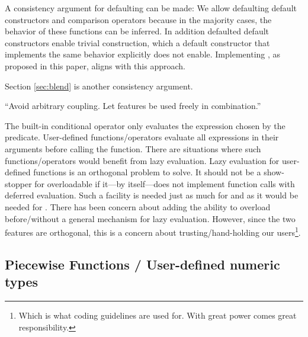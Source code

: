 \begin{description}
    A consistency argument for defaulting  can be made:
    We allow defaulting default constructors and comparison operators because in the majority cases, the behavior of these functions can be inferred.
    In addition defaulted default constructors enable trivial construction, which a default constructor that implements the same behavior explicitly does not enable.
    Implementing , as proposed in this paper, aligns with this approach.

    Section \ref{sec:blend} is another consistency argument.

  \item[Be orthogonal] “Avoid arbitrary coupling.
    Let features be used freely in combination.”

    The built-in conditional operator only evaluates the expression chosen by the predicate.
    User-defined functions/operators evaluate all expressions in their arguments before calling the function.
    There are situations where such functions/operators would benefit from lazy evaluation.
    Lazy evaluation for user-defined functions is an orthogonal problem to solve.
    It should not be a show-stopper for overloadable  if it---by itself---does not implement function calls with deferred evaluation.
    Such a facility is needed just as much for  and  as it would be needed for .
    There has been concern about adding the ability to overload  before/without a general mechanism for lazy evaluation.
    However, since the two features are orthogonal, this is a concern about trusting/hand-holding our users\footnote{Which is what coding guidelines are used for. With great power comes great responsibility.}.
\end{description}

\subsection{Piecewise Functions / User-defined numeric types}\label{sec:piecewise}

